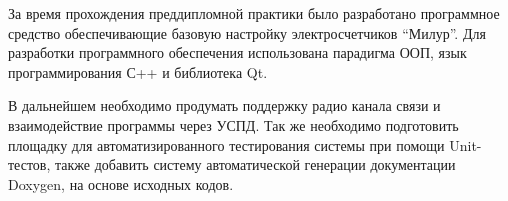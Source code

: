 \setcounter{figure}{0}
За время прохождения преддипломной практики было разработано программное средство обеспечивающие базовую настройку электросчетчиков ``Милур''.  Для разработки программного обеспечения использована парадигма ООП, язык программирования С++ и библиотека Qt.

В дальнейшем необходимо продумать поддержку радио канала связи и взаимодействие программы через УСПД. Так же необходимо подготовить площадку для автоматизированного тестирования системы при помощи Unit-тестов, также добавить систему автоматической генерации документации Doxygen, на основе исходных кодов.